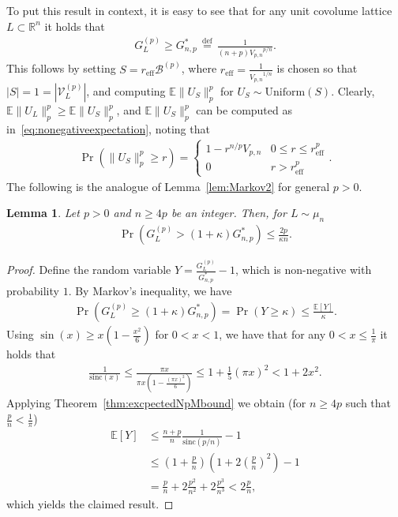 \documentclass[article,doublecolumn]{IEEEtran}
\newcommand{\EE}{{\mathbb{E}}}
\newcommand{\df}{{\, \stackrel{\mathrm{def}}{=}\, }}
\newcommand{\R}{{\mathbb{R}}}
\newcommand{\Unif}{\mathrm{Uniform}}
\newcommand{\mVLp}{{\mathcal{V}^{(p)}_L}}
\newcommand{\mBp}{{\mathcal{B}^{(p)}}}
\newcommand{\Vp}{{V_{p,n}}}
\newcommand{\GPl}{{G^{(p)}_L}}
\newcommand{\sinc}{{\mathrm{sinc}}}
\newtheorem{lem}[thm]{Lemma}
\begin{document}
To put this result in context, it is easy to see that for any unit covolume lattice $L\subset\R^n$ it holds that
\begin{align}
\GPl\geq G^*_{n,p}\df \frac{1}{(n+p)\Vp^{p/n}}.    
\end{align}
This follows by setting $S=r_{\text{eff}}\mBp$, where $r_{\text{eff}}=\frac{1}{\Vp^{1/n}}$ is chosen so that $|S|=1=|\mVLp|$, and computing $\EE\|U_{S}\|_p^p$ for $U_S\sim\Unif(S)$. Clearly, $\EE\|U_{L}\|_p^p\geq \EE\|U_S\|_p^p$, and $\EE\|U_{S}\|_p^p$ can be computed as in~\eqref{eq:nonegativeexpectation}, noting that
\begin{align}
  \Pr(\|U_S\|^p_p\geq r)=\begin{cases}
  1-r^{n/p}\Vp & 0\leq r\leq r_{\text{eff}}^p\\
  0 & r>r_{\text{eff}}^p
  \end{cases}.
\end{align}
The following is the analogue of Lemma~\ref{lem:Markov2} for general $p>0$.

\begin{lem}
\label{cor:NpMconcentration}
Let  $p>0$ and $n\geq 4 p$ be an integer. Then, for $L\sim\mu_n$ 
 \begin{align}
 \Pr\left(\GPl>(1+\kappa)G^*_{n,p}\right)\leq \frac{2p}{\kappa n}.
 \end{align}
\end{lem}

\begin{proof}
Define the random variable $Y=\frac{G^{(p)}_L}{G_{n,p}^*}-1$, which is non-negative with probability $1$.
By Markov's inequality, we have    
\begin{align}
\Pr\left(G^{(p)}_L\geq(1+\kappa) G^*_{{n,p}} \right)=\Pr(Y\geq \kappa)\leq\frac{\EE[Y]}{\kappa}.    
\end{align}
Using $\sin(x)\geq x(1-\frac{x^2}{6})$ for $0<x<1$, we have that for any $0<x\leq \frac{1}{\pi}$ it holds that
\begin{align}
\frac{1}{\sinc(x)}\leq\frac{\pi x}{\pi x(1-\frac{(\pi x)^2}{6})}\leq 1+\frac{1}{5}(\pi x)^2<1+2 x^2.   
\end{align}
Applying Theorem~\ref{thm:excpectedNpMbound} we obtain (for $n\geq 4 p$ such that $\frac{p}{n}<\frac{1}{\pi}$)
\begin{align}
\EE[Y]&\leq \frac{n+p}{n}\frac{1}{\sinc(p/n)}-1\\
&\leq \left(1+\frac{p}{n}\right)\left(1+2\left(\frac{p}{n}\right)^2\right) -1\\
&=\frac{p}{n}+2\frac{p^2}{n^2}+2\frac{p^3}{n^3}<2\frac{p}{n},
\end{align}
which yields the claimed result.
\end{proof}
\end{document}
